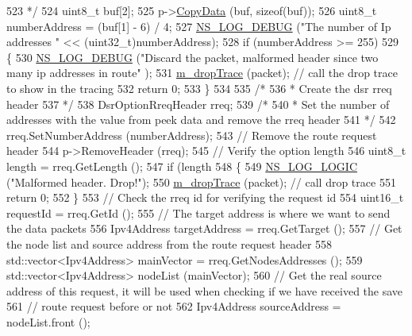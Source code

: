 \begin{DoxyCode}
523 \textcolor{comment}{   */}
524   uint8\_t buf[2];
525   p->\hyperlink{classns3_1_1Packet_a5a6d304b9e0d90733919ffe224b98f0d}{CopyData} (buf, \textcolor{keyword}{sizeof}(buf));
526   uint8\_t numberAddress = (buf[1] - 6) / 4;
527   \hyperlink{group__logging_ga413f1886406d49f59a6a0a89b77b4d0a}{NS\_LOG\_DEBUG} (\textcolor{stringliteral}{"The number of Ip addresses "} << (uint32\_t)numberAddress);
528   \textcolor{keywordflow}{if} (numberAddress >= 255)
529     \{
530       \hyperlink{group__logging_ga413f1886406d49f59a6a0a89b77b4d0a}{NS\_LOG\_DEBUG} (\textcolor{stringliteral}{"Discard the packet, malformed header since two many ip addresses in route"}
      );
531       \hyperlink{classns3_1_1dsr_1_1DsrOptions_a176bbc9efb58b6d750c14b9b03c525c4}{m\_dropTrace} (packet); \textcolor{comment}{// call the drop trace to show in the tracing}
532       \textcolor{keywordflow}{return} 0;
533     \}
534 
535   \textcolor{comment}{/*}
536 \textcolor{comment}{   * Create the dsr rreq header}
537 \textcolor{comment}{   */}
538   DsrOptionRreqHeader rreq;
539   \textcolor{comment}{/*}
540 \textcolor{comment}{   * Set the number of addresses with the value from peek data and remove the rreq header}
541 \textcolor{comment}{   */}
542   rreq.SetNumberAddress (numberAddress);
543   \textcolor{comment}{// Remove the route request header}
544   p->RemoveHeader (rreq);
545   \textcolor{comment}{// Verify the option length}
546   uint8\_t length = rreq.GetLength ();
547   \textcolor{keywordflow}{if} (length %
548     \{
549       \hyperlink{group__logging_ga88acd260151caf2db9c0fc84997f45ce}{NS\_LOG\_LOGIC} (\textcolor{stringliteral}{"Malformed header. Drop!"});
550       \hyperlink{classns3_1_1dsr_1_1DsrOptions_a176bbc9efb58b6d750c14b9b03c525c4}{m\_dropTrace} (packet); \textcolor{comment}{// call drop trace}
551       \textcolor{keywordflow}{return} 0;
552     \}
553   \textcolor{comment}{// Check the rreq id for verifying the request id}
554   uint16\_t requestId = rreq.GetId ();
555   \textcolor{comment}{// The target address is where we want to send the data packets}
556   Ipv4Address targetAddress = rreq.GetTarget ();
557   \textcolor{comment}{// Get the node list and source address from the route request header}
558   std::vector<Ipv4Address> mainVector = rreq.GetNodesAddresses ();
559   std::vector<Ipv4Address> nodeList (mainVector);
560   \textcolor{comment}{// Get the real source address of this request, it will be used when checking if we have received the
       save}
561   \textcolor{comment}{// route request before or not}
562   Ipv4Address sourceAddress = nodeList.front ();

\end{DoxyCode}
